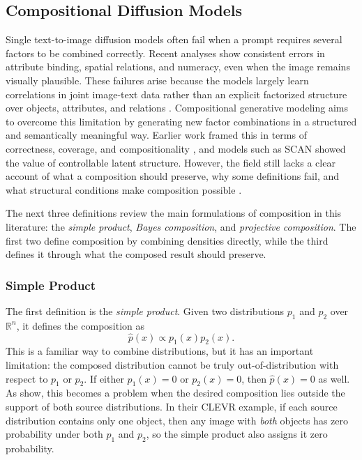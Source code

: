 
\subsection{Compositional Diffusion Models}
\label{sec:compositional_diffusion}

Single text-to-image diffusion models often fail when a prompt requires several factors to
be combined correctly. Recent analyses \citep{t2i_compbench_2025, du2024compositional,
mechanisms2025projective} show consistent errors in attribute binding, spatial relations,
and numeracy, even when the image remains visually plausible. These failures arise because
the models largely learn correlations in joint image-text data rather than an explicit
factorized structure over objects, attributes, and relations \citep{t2i_compbench_2025}.
Compositional generative modeling aims to overcome this limitation by generating new factor
combinations in a structured and semantically meaningful way. Earlier work framed this in
terms of correctness, coverage, and compositionality \citep{vedantam2017generative}, and
models such as SCAN \citep{higgins2017scan} showed the value of controllable latent
structure. However, the field still lacks a clear account of what a composition should
preserve, why some definitions fail, and what structural conditions make composition
possible \citep{mechanisms2025projective, du2024compositional}.


The next three definitions review the main formulations of composition in this literature: the \emph{simple product}, \emph{Bayes composition}, and \emph{projective composition}. 
The first two define composition by combining densities directly, while the third defines it through what the composed result should preserve.

\subsubsection{Simple Product}

The first definition is the \emph{simple product}. Given two distributions \(p_1\) and
\(p_2\) over \(\mathbb{R}^n\), it defines the composition as
\[
    \hat p(x) \propto p_1(x)p_2(x).
\]
This is a familiar way to combine distributions, but it has an important limitation: the
composed distribution cannot be truly out-of-distribution with respect to \(p_1\) or
\(p_2\). If either \(p_1(x)=0\) or \(p_2(x)=0\), then \(\hat p(x)=0\) as well. As
\citet{mechanisms2025projective} show, this becomes a problem when the desired
composition lies outside the support of both source distributions. In their CLEVR example,
if each source distribution contains only one object, then any image with \emph{both}
objects has zero probability under both \(p_1\) and \(p_2\), so the simple product also
assigns it zero probability. 

